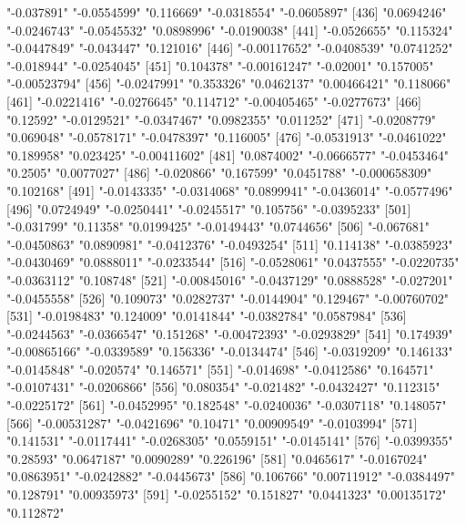 \begin{Schunk}
\begin{Soutput}
[431] "-0.037891"    "-0.0554599"   "0.116669"     "-0.0318554"   "-0.0605897"  
[436] "0.0694246"    "-0.0246743"   "-0.0545532"   "0.0898996"    "-0.0190038"  
[441] "-0.0526655"   "0.115324"     "-0.0447849"   "-0.043447"    "0.121016"    
[446] "-0.00117652"  "-0.0408539"   "0.0741252"    "-0.018944"    "-0.0254045"  
[451] "0.104378"     "-0.00161247"  "-0.02001"     "0.157005"     "-0.00523794" 
[456] "-0.0247991"   "0.353326"     "0.0462137"    "0.00466421"   "0.118066"    
[461] "-0.0221416"   "-0.0276645"   "0.114712"     "-0.00405465"  "-0.0277673"  
[466] "0.12592"      "-0.0129521"   "-0.0347467"   "0.0982355"    "0.011252"    
[471] "-0.0208779"   "0.069048"     "-0.0578171"   "-0.0478397"   "0.116005"    
[476] "-0.0531913"   "-0.0461022"   "0.189958"     "0.023425"     "-0.00411602" 
[481] "0.0874002"    "-0.0666577"   "-0.0453464"   "0.2505"       "0.0077027"   
[486] "-0.020866"    "0.167599"     "0.0451788"    "-0.000658309" "0.102168"    
[491] "-0.0143335"   "-0.0314068"   "0.0899941"    "-0.0436014"   "-0.0577496"  
[496] "0.0724949"    "-0.0250441"   "-0.0245517"   "0.105756"     "-0.0395233"  
[501] "-0.031799"    "0.11358"      "0.0199425"    "-0.0149443"   "0.0744656"   
[506] "-0.067681"    "-0.0450863"   "0.0890981"    "-0.0412376"   "-0.0493254"  
[511] "0.114138"     "-0.0385923"   "-0.0430469"   "0.0888011"    "-0.0233544"  
[516] "-0.0528061"   "0.0437555"    "-0.0220735"   "-0.0363112"   "0.108748"    
[521] "-0.00845016"  "-0.0437129"   "0.0888528"    "-0.027201"    "-0.0455558"  
[526] "0.109073"     "0.0282737"    "-0.0144904"   "0.129467"     "-0.00760702" 
[531] "-0.0198483"   "0.124009"     "0.0141844"    "-0.0382784"   "0.0587984"   
[536] "-0.0244563"   "-0.0366547"   "0.151268"     "-0.00472393"  "-0.0293829"  
[541] "0.174939"     "-0.00865166"  "-0.0339589"   "0.156336"     "-0.0134474"  
[546] "-0.0319209"   "0.146133"     "-0.0145848"   "-0.020574"    "0.146571"    
[551] "-0.014698"    "-0.0412586"   "0.164571"     "-0.0107431"   "-0.0206866"  
[556] "0.080354"     "-0.021482"    "-0.0432427"   "0.112315"     "-0.0225172"  
[561] "-0.0452995"   "0.182548"     "-0.0240036"   "-0.0307118"   "0.148057"    
[566] "-0.00531287"  "-0.0421696"   "0.10471"      "0.00909549"   "-0.0103994"  
[571] "0.141531"     "-0.0117441"   "-0.0268305"   "0.0559151"    "-0.0145141"  
[576] "-0.0399355"   "0.28593"      "0.0647187"    "0.0090289"    "0.226196"    
[581] "0.0465617"    "-0.0167024"   "0.0863951"    "-0.0242882"   "-0.0445673"  
[586] "0.106766"     "0.00711912"   "-0.0384497"   "0.128791"     "0.00935973"  
[591] "-0.0255152"   "0.151827"     "0.0441323"    "0.00135172"   "0.112872"    

\end{Soutput}
\end{Schunk}

